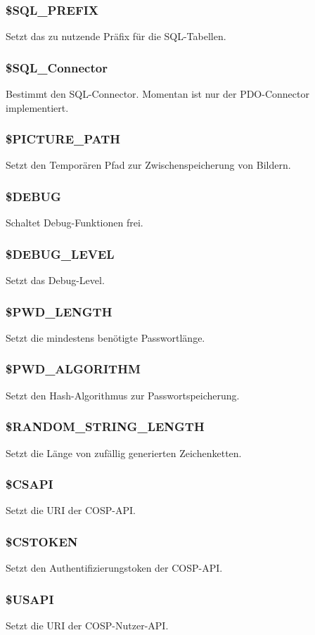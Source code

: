 \subsubsection{\$SQL\_PREFIX} Setzt das zu nutzende Präfix für die SQL-Tabellen.
\subsubsection{\$SQL\_Connector} Bestimmt den SQL-Connector. Momentan ist nur der PDO-Connector implementiert.
\subsubsection{\$PICTURE\_PATH} Setzt den Temporären Pfad zur Zwischenspeicherung von Bildern.
\subsubsection{\$DEBUG} Schaltet Debug-Funktionen frei.
\subsubsection{\$DEBUG\_LEVEL} Setzt das Debug-Level.
\subsubsection{\$PWD\_LENGTH} Setzt die mindestens benötigte Passwortlänge.
\subsubsection{\$PWD\_ALGORITHM} Setzt den Hash-Algorithmus zur Passwortspeicherung.
\subsubsection{\$RANDOM\_STRING\_LENGTH} Setzt die Länge von zufällig generierten Zeichenketten.
\subsubsection{\$CSAPI} Setzt die URI der {\glqq COSP\grqq}-API.
\subsubsection{\$CSTOKEN} Setzt den Authentifizierungstoken der {\glqq COSP\grqq}-API.
\subsubsection{\$USAPI} Setzt die URI der {\glqq COSP\grqq}-Nutzer-API.
